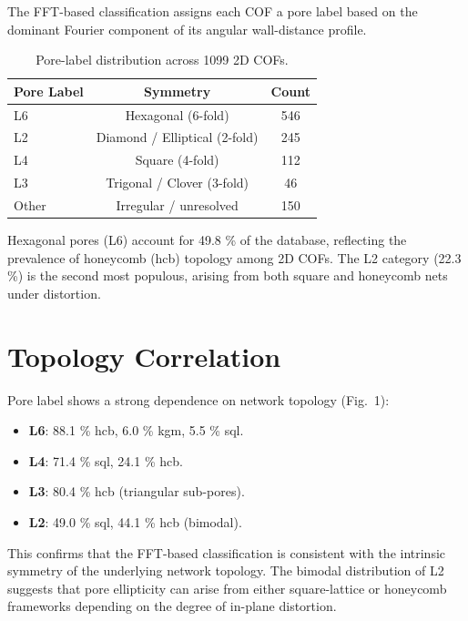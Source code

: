 \documentclass[11pt,a4paper]{article}
\begin{document}
The FFT-based classification assigns each COF a pore label based on the
dominant Fourier component of its angular wall-distance profile.

\begin{table}[h]
\centering
\begin{tabular}{lcc}
\toprule
Pore Label & Symmetry & Count \\
\midrule
L6 & Hexagonal (6-fold) & 546 \\
L2 & Diamond / Elliptical (2-fold) & 245 \\
L4 & Square (4-fold) & 112 \\
L3 & Trigonal / Clover (3-fold) & 46 \\
Other & Irregular / unresolved & 150 \\
\bottomrule
\end{tabular}
\caption{Pore-label distribution across 1099 2D COFs.}
\end{table}

Hexagonal pores (L6) account for 49.8 \% of the database, reflecting the
prevalence of honeycomb (hcb) topology among 2D COFs.  The L2 category
(22.3 \%) is the second most populous, arising from both square and
honeycomb nets under distortion.

\section{Topology Correlation}

Pore label shows a strong dependence on network topology (Fig.~1):

\begin{itemize}
    \item \textbf{L6}: 88.1 \% hcb, 6.0 \% kgm, 5.5 \% sql.
    \item \textbf{L4}: 71.4 \% sql, 24.1 \% hcb.
    \item \textbf{L3}: 80.4 \% hcb (triangular sub-pores).
    \item \textbf{L2}: 49.0 \% sql, 44.1 \% hcb (bimodal).
\end{itemize}

This confirms that the FFT-based classification is consistent with the
intrinsic symmetry of the underlying network topology.  The bimodal
distribution of L2 suggests that pore ellipticity can arise from either
square-lattice or honeycomb frameworks depending on the degree of
in-plane distortion.
\end{document}
